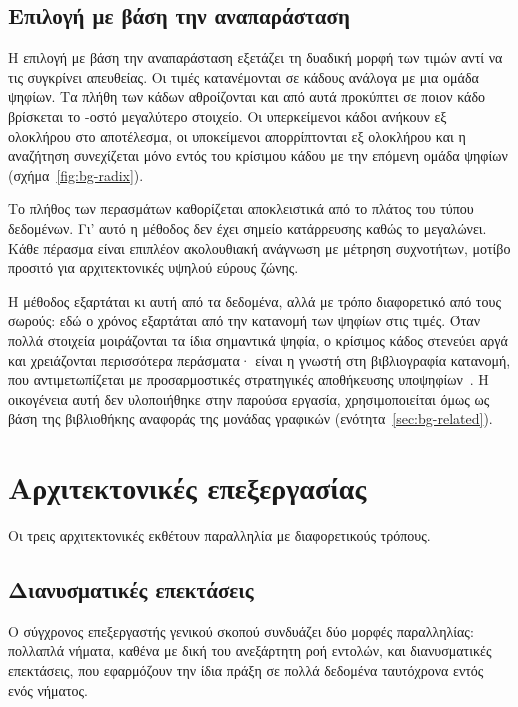 

\subsection{Επιλογή με βάση την αναπαράσταση}
\label{sec:bg-radix}

Η επιλογή με βάση την αναπαράσταση εξετάζει τη δυαδική μορφή των τιμών αντί να
τις συγκρίνει απευθείας. Οι τιμές κατανέμονται σε κάδους ανάλογα με μια ομάδα
ψηφίων. Τα πλήθη των κάδων αθροίζονται και από αυτά προκύπτει σε ποιον κάδο
βρίσκεται το -οστό μεγαλύτερο στοιχείο. Οι υπερκείμενοι κάδοι ανήκουν εξ
ολοκλήρου στο αποτέλεσμα, οι υποκείμενοι απορρίπτονται εξ ολοκλήρου και η
αναζήτηση συνεχίζεται μόνο εντός του κρίσιμου κάδου με την επόμενη ομάδα ψηφίων
(σχήμα~\ref{fig:bg-radix}).

Το πλήθος των περασμάτων καθορίζεται αποκλειστικά από το πλάτος του τύπου
δεδομένων. Γι' αυτό η μέθοδος δεν έχει σημείο κατάρρευσης καθώς το 
μεγαλώνει. Κάθε πέρασμα είναι επιπλέον ακολουθιακή ανάγνωση με μέτρηση
συχνοτήτων, μοτίβο προσιτό για αρχιτεκτονικές υψηλού εύρους ζώνης.

Η μέθοδος εξαρτάται κι αυτή από τα δεδομένα, αλλά με τρόπο διαφορετικό από τους
σωρούς: εδώ ο χρόνος εξαρτάται από την κατανομή των ψηφίων στις τιμές. Όταν
πολλά στοιχεία μοιράζονται τα ίδια σημαντικά ψηφία, ο κρίσιμος κάδος στενεύει
αργά και χρειάζονται περισσότερα περάσματα· είναι η γνωστή στη βιβλιογραφία
 κατανομή, που αντιμετωπίζεται με προσαρμοστικές
στρατηγικές αποθήκευσης υποψηφίων~\cite{zhang2023gputopk}. Η οικογένεια αυτή
δεν υλοποιήθηκε στην παρούσα εργασία, χρησιμοποιείται όμως ως βάση της
βιβλιοθήκης αναφοράς της μονάδας γραφικών (ενότητα~\ref{sec:bg-related}).



\section{Αρχιτεκτονικές επεξεργασίας}
\label{sec:bg-architectures}

Οι τρεις αρχιτεκτονικές εκθέτουν παραλληλία με διαφορετικούς τρόπους.

\subsection{Διανυσματικές επεκτάσεις }
\label{sec:bg-arch-cpu}

Ο σύγχρονος επεξεργαστής γενικού σκοπού συνδυάζει δύο μορφές παραλληλίας:
πολλαπλά νήματα, καθένα με δική του ανεξάρτητη ροή εντολών, και διανυσματικές
επεκτάσεις, που εφαρμόζουν την ίδια πράξη σε πολλά δεδομένα ταυτόχρονα εντός
ενός νήματος.

